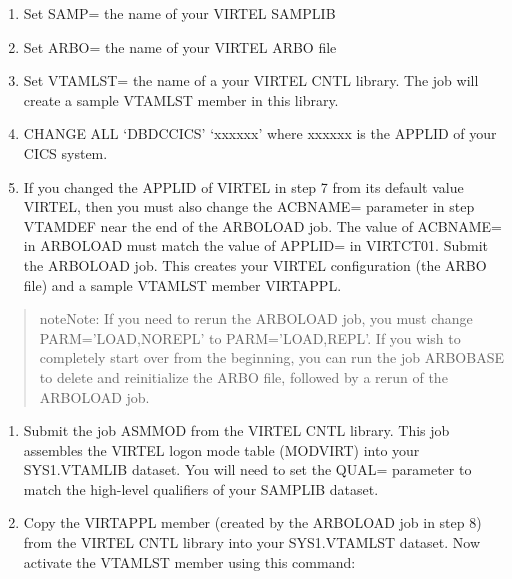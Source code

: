 \documentclass[letterpaper,10pt,english]{sphinxmanual}
\begin{document}
\begin{enumerate}
\begin{enumerate}
\item {} 
Set SAMP= the name of your VIRTEL SAMPLIB

\item {} 
Set ARBO= the name of your VIRTEL ARBO file

\item {} 
Set VTAMLST= the name of a your VIRTEL CNTL library. The job will create a sample VTAMLST member in this library.

\item {} 
CHANGE ALL ‘DBDCCICS’ ‘xxxxxx’ where xxxxxx is the APPLID of your CICS system.

\item {} 
If you changed the APPLID of VIRTEL in step 7 from its default value VIRTEL, then you must also change the ACBNAME= parameter in step VTAMDEF near the end of the ARBOLOAD job. The value of ACBNAME= in ARBOLOAD must match the value of APPLID= in VIRTCT01. Submit the ARBOLOAD job. This creates your VIRTEL configuration (the ARBO file) and a sample VTAMLST member VIRTAPPL.

\end{enumerate}

\end{enumerate}
\begin{quote}

\begin{sphinxadmonition}{note}{Note:}
If you need to rerun the ARBOLOAD job, you must change PARM=’LOAD,NOREPL’ to PARM=’LOAD,REPL’. If you wish to completely start over from the beginning, you can run the job ARBOBASE to delete and reinitialize the ARBO file, followed by a rerun of the ARBOLOAD job.
\end{sphinxadmonition}
\end{quote}
\begin{enumerate}
\def\theenumi{\arabic{enumi}}
\def\labelenumi{\theenumi .}
\makeatletter\def\p@enumii{\p@enumi \theenumi .}\makeatother
\setcounter{enumi}{9}
\item {} 
Submit the job ASMMOD from the VIRTEL CNTL library. This job assembles the VIRTEL logon mode table (MODVIRT) into your SYS1.VTAMLIB dataset. You will need to set the QUAL= parameter to match the high-level qualifiers of your SAMPLIB dataset.

\item {} 
Copy the VIRTAPPL member (created by the ARBOLOAD job in step 8) from the VIRTEL CNTL library into your SYS1.VTAMLST dataset. Now activate the VTAMLST member using this command:

\end{enumerate}
\end{document}

